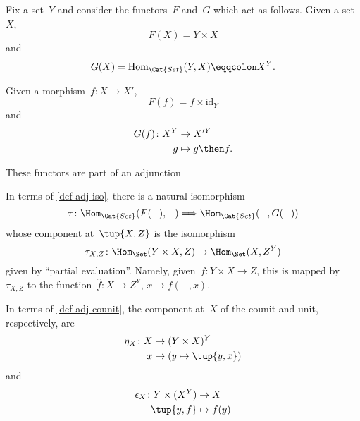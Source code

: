 Fix a set~$Y$ and consider the functors~$F$ and~$G$ which act as follows. Given a set~$X$,
\begin{equation*}
    F(X) = Y \times X
\end{equation*}
and
\begin{equation*}
    G(X) = \text{Hom}_{\Cat{Set}}(Y, X) \eqqcolon X^Y.
\end{equation*}

Given a morphism~$f\colon X \to X'$,
\begin{equation*}
    F(f) = f \times \text{id}_Y
\end{equation*}
and
\begin{equation*}
    \begin{aligned}
        G(f)\colon X^Y &\to X'^Y\\
        g &\mapsto g \then f.
    \end{aligned}
\end{equation*}

These functors are part of an adjunction

\begin{center}
\end{center}
In terms of \cref{def-adj-iso}, there is a natural isomorphism
\begin{equation*}
    \tau\colon \Hom_{\Cat{Set}}(F(- ), - )  \Longrightarrow  \Hom_{\Cat{Set}}(- , G( - ))
\end{equation*}
whose component at~$\tup{X,Z}$ is the isomorphism
\begin{equation*}
    \tau_{X,Z} \colon \Hom_{\Set}(Y \times X, Z) \to \Hom_{\Set}(X, Z^Y)
\end{equation*}
given by ``partial evaluation''. Namely, given~$f\colon Y \times X \to Z$,  this is mapped by~$\tau_{X,Z}$ to the function~$\hat f\colon X \to Z^Y$, $x \mapsto f( -, x)$.

In terms of \cref{def-adj-counit}, the component at~$X$ of the counit and unit, respectively, are
\begin{equation*}
    \begin{aligned}
        \eta_X \colon X &\to  (Y \times X)^Y\\
        x &\mapsto (y \mapsto \tup{y,x})
    \end{aligned}
\end{equation*}
and
\begin{equation*}
    \begin{aligned}
        \epsilon_X \colon Y \times (X^Y) &\to X\\
        \tup{y,f} &\mapsto f(y)
    \end{aligned}
\end{equation*}


